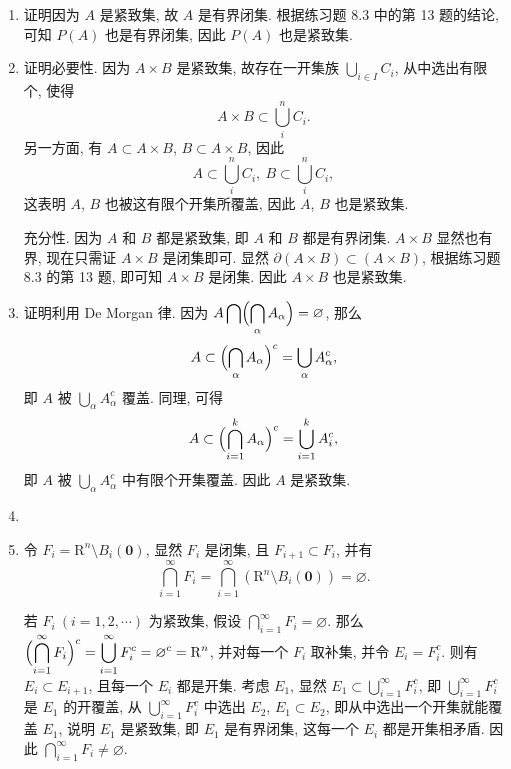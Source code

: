 \documentclass[a4paper, 11pt]{ctexart}
\begin{document}
\begin{enumerate}
    \item %
        {\heiti 证明}\quad 因为 $A$ 是紧致集, 故 $A$ 是有界闭集. 根据练习题 8.3 中的第 13 题的结论,
        可知 $P(A)$ 也是有界闭集, 因此 $P(A)$ 也是紧致集.
    \item %
        {\heiti 证明}\quad 必要性. 因为 $A \times B$ 是紧致集, 故存在一开集族 $\bigcup_{i \in I}C_i$, 从中选出有限个, 使得
        \[
            A \times B \subset \bigcup_{i}^{n}C_i.    
        \]
        另一方面, 有 $A \subset A \times B$, $B \subset A \times B$, 因此
        \[
            A \subset \bigcup_{i}^{n}C_i,\ B \subset \bigcup_{i}^{n}C_i,   
        \]
        这表明 $A$, $B$ 也被这有限个开集所覆盖, 因此 $A$, $B$ 也是紧致集.

        充分性. 因为 $A$ 和 $B$ 都是紧致集, 即 $A$ 和 $B$ 都是有界闭集. $A \times B$ 显然也有界, 现在只需证 $A \times B$ 是闭集即可.
        显然 $\partial(A \times B) \subset (A \times B)$, 根据练习题 8.3 的第 13 题, 即可知 $A \times B$ 是闭集. 因此 $A \times B$ 也是紧致集.
    \item %
        {\heiti 证明}\quad 利用 De Morgan 律. 因为 $\displaystyle{A \bigcap \Bigl(\bigcap_{\alpha}A_\alpha\Bigr) = \varnothing}$, 那么
        \[
            A \subset \Bigl(\bigcap_{\alpha}A_\alpha\Bigr)^c = \bigcup_{\alpha}A_\alpha^c,
        \]
        即 $A$ 被 $\displaystyle{\bigcup_{\alpha}A_\alpha^c}$ 覆盖. 同理, 可得
        \[
            A \subset \Bigl(\bigcap_{i=1}^kA_\alpha\Bigr)^c =  \bigcup_{i=1}^kA_i^c,   
        \]
        即 $A$ 被 $\displaystyle{\bigcup_{\alpha}A_\alpha^c}$ 中有限个开集覆盖. 因此 $A$ 是紧致集.

    \item %
    \item %
        令 $F_i = \mathrm{R}^n \setminus B_i(\boldsymbol{0})$, 显然 $F_i$ 是闭集, 且 $F_{i+1} \subset F_i$, 并有
        \[
            \bigcap_{i=1}^{\infty}F_i = \bigcap_{i=1}^{\infty}\left(\mathrm{R}^n \setminus B_i(\boldsymbol{0})\right) = \varnothing.    
        \]
        
        若 $F_i\ (i = 1, 2, \cdots)$ 为紧致集, 假设 $\displaystyle{\bigcap_{i=1}^{\infty}F_i = \varnothing}$.
        那么 $\displaystyle{\Bigl(\bigcap_{i=1}^{\infty}F_i\Bigr)^c = \bigcup_{i=1}^{\infty}F_i^c = \varnothing^c = \mathrm{R}^n}$, 并对每一个 $F_i$ 取补集, 并令 $E_i = F_i^c$.
        则有 $E_i \subset E_{i+1}$, 且每一个 $E_i$ 都是开集. 考虑 $E_1$, 显然 $E_1 \subset \bigcup_{i=1}^{\infty}F_i^c$, 即 $\bigcup_{i=1}^{\infty}F_i^c$ 是 $E_1$ 的开覆盖,
        从 $\bigcup_{i=1}^{\infty}F_i^c$ 中选出 $E_2$, $E_1 \subset E_2$, 即从中选出一个开集就能覆盖 $E_1$, 说明 $E_1$ 是紧致集, 即 $E_1$ 是有界闭集, 这每一个 $E_i$ 都是开集相矛盾.
        因此 $\displaystyle{\bigcap_{i=1}^{\infty}F_i \neq \varnothing}$.
\end{enumerate}
\end{document}
